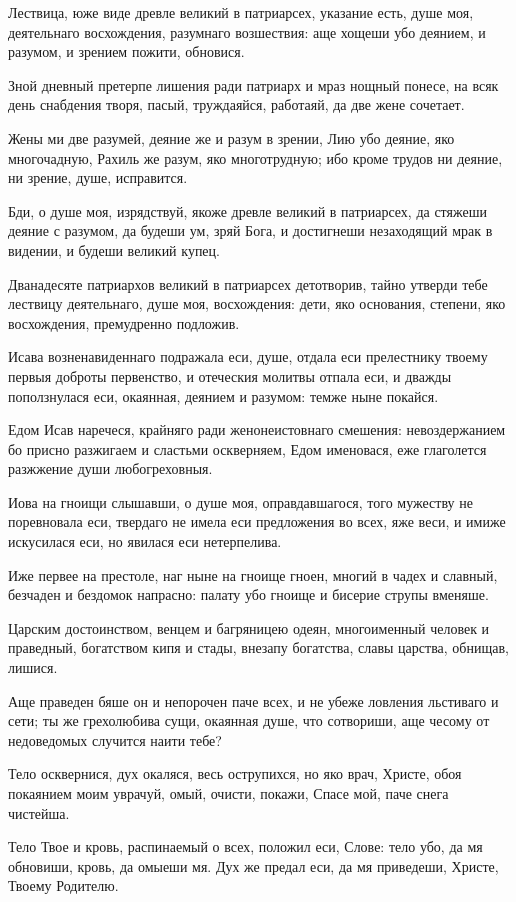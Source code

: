 Лествица, юже виде древле великий в патриарсех, указание есть, душе моя, деятельнаго восхождения, разумнаго возшествия: аще хощеши убо деянием, и разумом, и зрением пожити, обновися.

Зной дневный претерпе лишения ради патриарх и мраз нощный понесе, на всяк день снабдения творя, пасый, труждаяйся, работаяй, да две жене сочетает.

Жены ми две разумей, деяние же и разум в зрении, Лию убо деяние, яко многочадную, Рахиль же разум, яко многотрудную; ибо кроме трудов ни деяние, ни зрение, душе, исправится.

Бди, о душе моя, изрядствуй, якоже древле великий в патриарсех, да стяжеши деяние с разумом, да будеши ум, зряй Бога, и достигнеши незаходящий мрак в видении, и будеши великий купец.

Дванадесяте патриархов великий в патриарсех детотворив, тайно утверди тебе лествицу деятельнаго, душе моя, восхождения: дети, яко основания, степени, яко восхождения, премудренно подложив.

Исава возненавиденнаго подражала еси, душе, отдала еси прелестнику твоему первыя доброты первенство, и отеческия молитвы отпала еси, и дважды поползнулася еси, окаянная, деянием и разумом: темже ныне покайся.

Едом Исав наречеся, крайняго ради женонеистовнаго смешения: невоздержанием бо присно разжигаем и сластьми оскверняем, Едом именовася, еже глаголется разжжение души любогреховныя.

Иова на гноищи слышавши, о душе моя, оправдавшагося, того мужеству не поревновала еси, твердаго не имела еси предложения во всех, яже веси, и имиже искусилася еси, но явилася еси нетерпелива.

Иже первее на престоле, наг ныне на гноище гноен, многий в чадех и славный, безчаден и бездомок напрасно: палату убо гноище и бисерие струпы вменяше.

Царским достоинством, венцем и багряницею одеян, многоименный человек и праведный, богатством кипя и стады, внезапу богатства, славы царства, обнищав, лишися.

Аще праведен бяше он и непорочен паче всех, и не убеже ловления льстиваго и сети; ты же грехолюбива сущи, окаянная душе, что сотвориши, аще чесому от недоведомых случится наити тебе?

Тело осквернися, дух окаляся, весь острупихся, но яко врач, Христе, обоя покаянием моим уврачуй, омый, очисти, покажи, Спасе мой, паче снега чистейша.

Тело Твое и кровь, распинаемый о всех, положил еси, Слове: тело убо, да мя обновиши, кровь, да омыеши мя. Дух же предал еси, да мя приведеши, Христе, Твоему Родителю.

